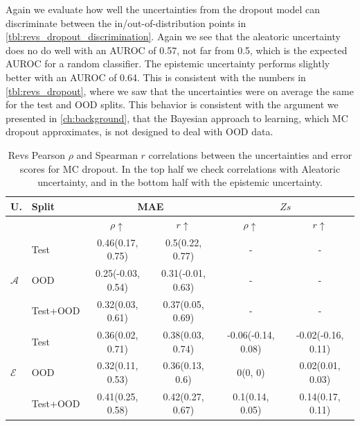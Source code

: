 Again we evaluate how well the uncertainties from the dropout model can discriminate between the in/out-of-distribution points in \cref{tbl:revs_dropout_discrimination}. Again we see that the aleatoric uncertainty does no do well with an AUROC of 0.57, not far from 0.5, which is the expected AUROC for a random classifier. The epistemic uncertainty performs slightly better with an AUROC of 0.64. This is consistent with the numbers in \cref{tbl:revs_dropout}, where we saw that the uncertainties were on average the same for the test and OOD splits. This behavior is consistent with the argument we presented in \cref{ch:background}, that the Bayesian approach to learning, which MC dropout approximates, is not designed to deal with OOD data. 


\begin{table}[htbp]
\centering
    \begin{tabular}{l l c c c c}  
        \toprule
        U. & Split & \multicolumn{2}{c}{MAE} & \multicolumn{2}{c}{$Zs$}\\
        \midrule
        & & $\rho \uparrow$ & $r \uparrow$ & $\rho \uparrow$ & $r \uparrow$ \\
        \multirow{3}{*}{$\mathcal{A}$} 
            & Test     & 0.46(0.17, 0.75) & 0.5(0.22, 0.77) & - & - \\  
            & OOD      & 0.25(-0.03, 0.54) & 0.31(-0.01, 0.63) & - & - \\  
            & Test+OOD & 0.32(0.03, 0.61) & 0.37(0.05, 0.69) & - & - \\ 

        \midrule
        \multirow{3}{*}{$\mathcal{E}$} 
            & Test     & 0.36(0.02, 0.71)  & 0.38(0.03, 0.74) &  -0.06(-0.14, 0.08)  & -0.02(-0.16, 0.11) \\ & OOD      & 0.32(0.11, 0.53) & 0.36(0.13, 0.6) &  0(0, 0) & 0.02(0.01, 0.03) \\
            & Test+OOD & 0.41(0.25, 0.58) & 0.42(0.27, 0.67) &  0.1(0.14, 0.05) & 0.14(0.17, 0.11) \\ 

        \toprule
    \end{tabular}
    \caption[Revs error-uncertainty correlation for MC-dropout]{Revs Pearson $\rho$ and Spearman $r$ correlations between the uncertainties and error scores for MC dropout. In the top half we check correlations with Aleatoric uncertainty, and in the bottom half with the epistemic uncertainty.}
    \label{tbl:revs_dropout_corr}
\end{table}


